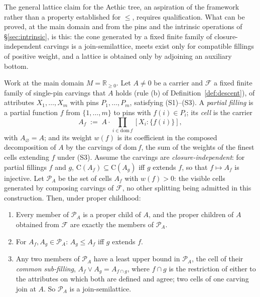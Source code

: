 \noindent The general lattice claim for the Aethic tree, an aspiration of the framework rather than a property established for $\le$, requires qualification. What can be proved, at the main domain and from the pins and the intrinsic operations of \S\ref{sec:intrinsic}, is this: the cone generated by a fixed finite family of closure-independent carvings is a join-semilattice, meets exist only for compatible fillings of positive weight, and a lattice is obtained only by adjoining an auxiliary bottom.

\begin{theorem}\label{thm:proper-lattice}
Work at the main domain $M = \mathbb{R}_{\ge 0}$. Let $A \ne 0$ be a carrier and $\mathcal{F}$ a fixed finite family of single-pin carvings that $A$ holds (rule (b) of Definition~\ref{def:descent}), of attributes $X_1, \dots, X_m$ with pins $P_1, \dots, P_m$, satisfying (S1)--(S3). A \emph{partial filling} is a partial function $f$ from $\{1, \dots, m\}$ to pins with $f(i) \in P_i$; its \emph{cell} is the carrier
\[
A_f \;:=\; A \cdot \prod_{i \in \mathrm{dom}\, f} [X_i : \{f(i)\}],
\]
with $A_\varnothing = A$; and its weight $w(f)$ is its coefficient in the composed decomposition of $A$ by the carvings of $\mathrm{dom}\, f$, the sum of the weights of the finest cells extending $f$ under (S3). Assume the carvings are \emph{closure-independent}: for partial fillings $f$ and $g$, $\mathrm{C}(A_f) \subseteq \mathrm{C}(A_g)$ iff $g$ extends $f$, so that $f \mapsto A_f$ is injective. Let $\mathcal{P}_A$ be the set of cells $A_f$ with $w(f) > 0$: the visible cells generated by composing carvings of $\mathcal{F}$, no other splitting being admitted in this construction. Then, under proper childhood:
\begin{enumerate}
\item[(i)] Every member of $\mathcal{P}_A$ is a proper child of $A$, and the proper children of $A$ obtained from $\mathcal{F}$ are exactly the members of $\mathcal{P}_A$.
\item[(ii)] For $A_f, A_g \in \mathcal{P}_A$: $A_g \le A_f$ iff $g$ extends $f$.
\item[(iii)] Any two members of $\mathcal{P}_A$ have a least upper bound in $\mathcal{P}_A$, the cell of their \emph{common sub-filling}, $A_f \vee A_g = A_{f \cap g}$, where $f \cap g$ is the restriction of either to the attributes on which both are defined and agree; two cells of one carving join at $A$. So $\mathcal{P}_A$ is a join-semilattice.

\end{enumerate}
\end{theorem}
